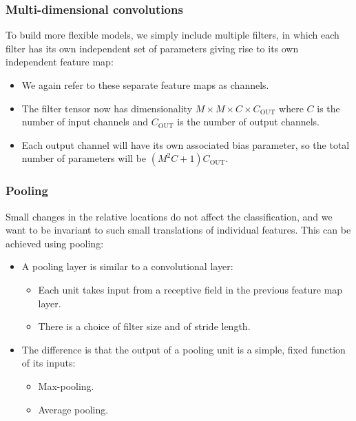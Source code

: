 \documentclass{beamer}
\begin{document}
\begin{frame}
    \frametitle{Multi-dimensional convolutions}
    To build more flexible models, we simply include multiple filters, in which each filter has its own independent set of parameters giving rise to its own independent feature map:
    \begin{itemize}
        \item We again refer to these separate feature maps as channels.
        \item The filter tensor now has dimensionality $M\times{}M\times{}C\times{}C_{\textrm{OUT}}$ where $C$ is the number of input channels and $C_{\textrm{OUT}}$ is the number of output channels.
        \item Each output channel will have its own associated bias parameter, so the total number of parameters will be $(M^{2}C+1)C_{\textrm{OUT}}$.
    \end{itemize}
\end{frame}

\begin{frame}
    \frametitle{Pooling}
    Small changes in the relative locations do not affect the classification, and we want to be invariant to such small translations of individual features. This can be achieved using pooling:
    \begin{itemize}
        \item A pooling layer is similar to a convolutional layer:
        \begin{itemize}
            \item Each unit takes input from a receptive field in the previous feature map layer.
            \item There is a choice of filter size and of stride length.
        \end{itemize}
        \item The difference is that the output of a pooling unit is a simple, fixed function of its inputs:
        \begin{itemize}
            \item Max-pooling.
            \item Average pooling.
        \end{itemize}
    \end{itemize}
\end{frame}
\end{document}
